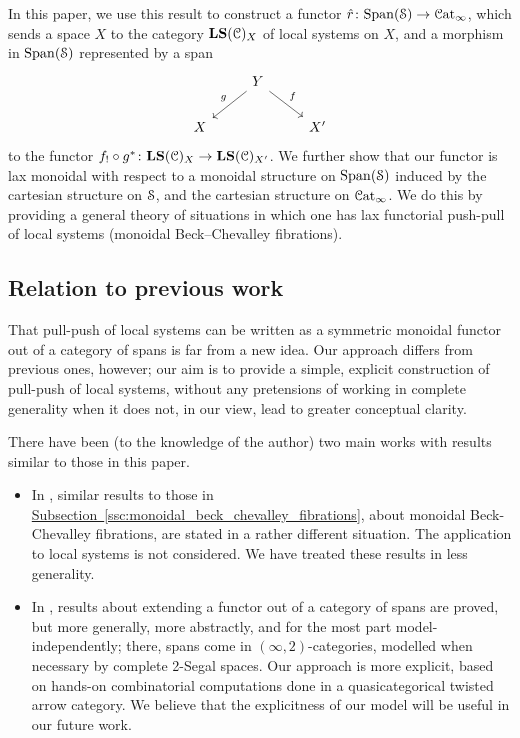 \documentclass[main.tex]{subfiles}
\begin{document}
In this paper, we use this result to construct a functor $\hat{r}\colon \Span(\category{S}) \to \ICat$, which sends a space $X$ to the category $\LS(\category{C})_{X}$ of local systems on $X$, and a morphism in $\Span(\S)$ represented by a span
\begin{equation*}
  \begin{tikzcd}
    & Y
    \arrow[dl, swap, "g"]
    \arrow[dr, "f"]
    \\
    X
    && X'
  \end{tikzcd}
\end{equation*}
to the functor $f_{!} \circ g^{*}\colon \LS(\category{C})_{X} \to \LS(\category{C})_{X'}$. We further show that our functor is lax monoidal with respect to a monoidal structure on $\Span(\S)$ induced by the cartesian structure on $\S$, and the cartesian structure on $\ICat$. We do this by providing a general theory of situations in which one has lax functorial push-pull of local systems (monoidal Beck--Chevalley fibrations). 

\subsection{Relation to previous work}
\label{ssc:relation_to_previous_work}

That pull-push of local systems can be written as a symmetric monoidal functor out of a category of spans is far from a new idea. Our approach differs from previous ones, however; our aim is to provide a simple, explicit construction of pull-push of local systems, without any pretensions of working in complete generality when it does not, in our view, lead to greater conceptual clarity. 

There have been (to the knowledge of the author) two main works with results similar to those in this paper.
\begin{itemize}
  \item In \cite{spectralmackeyfunctors2}, similar results to those in \hyperref[ssc:monoidal_beck_chevalley_fibrations]{Subsection~\ref*{ssc:monoidal_beck_chevalley_fibrations}}, about monoidal Beck-Chevalley fibrations, are stated in a rather different situation. The application to local systems is not considered. We have treated these results in less generality.

  \item In \cite{gaitsgory2019study}, results about extending a functor out of a category of spans are proved, but more generally, more abstractly, and for the most part model-independently; there, spans come in $(\infty, 2)$-categories, modelled when necessary by complete 2-Segal spaces. Our approach is more explicit, based on hands-on combinatorial computations done in a quasicategorical twisted arrow category. We believe that the explicitness of our model will be useful in our future work.
\end{itemize}
\end{document}
